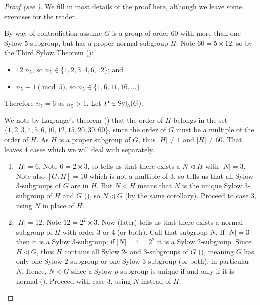 \begin{proof}[Proof (see {\cite[p.~145, Proposition 21]{dummit_foote_2004}})]
    We fill in most details of the proof here, although we leave some exercises for the reader.

    By way of contradiction assume $G$ is a group of order 60 with more than one Sylow 5-subgroup, but has a proper normal subgroup $H$. Note $60 = 5 \times 12$, so by the Third Sylow Theorem ():
    \begin{itemize}
        \item $12 \vert n_5$, so $n_5 \in \{1, 2, 3, 4, 6, 12\}$; and
        \item $n_5 \equiv 1 \pmod 5$, so $n_5 \in \{1, 6, 11, 16, \dots\}$.
    \end{itemize}
    Therefore $n_5 = 6$ as $n_5 > 1$. Let $P \in \mathrm{Syl}_{5}(G)$.

    We note by Lagrange's theorem () that the order of $H$ belongs in the set $\{1, 2, 3, 4, 5, 6, 10, 12, 15, 20, 30, 60\}$, since the order of $G$ must be a multiple of the order of $H$. As $H$ is a proper subgroup of $G$, thus $|H| \neq 1$ and $|H| \neq 60$. That leaves 4 cases which we will deal with separately.
    \begin{enumerate}
        \item $|H| = 6$. Note $6 = 2 \times 3$, so  tells us that there exists a $N \lhd H$ with $|N| = 3$. Note also $[G:H] = 10$ which is not a multiple of 3, so  tells us that all Sylow 3-subgroups of $G$ are in $H$. But $N \lhd H$ means that $N$ is the unique Sylow 3-subgroup of $H$ and $G$ (), so $N \lhd G$ (by the same corollary). Proceed to case 3, using $N$ in place of $H$.
        
        \item $|H| = 12$. Note $12 = 2^2 \times 3$. Now  (later) tells us that there exists a normal subgroup of $H$ with order 3 or 4 (or both). Call that subgroup $N$. If $|N| = 3$ then it is a Sylow 3-subgroup; if $|N| = 4 = 2^2$ it is a Sylow 2-subgroup. Since $H \lhd G$, thus $H$ contains all Sylow 2- and 3-subgroups of $G$ (), meaning $G$ has only one Sylow 2-subgroup or one Sylow 3-subgroup (or both), in particular $N$. Hence, $N \lhd G$ since a Sylow $p$-subgroup is unique if and only if it is normal (). Proceed with case 3, using $N$ instead of $H$.
        

\end{enumerate}
\end{proof}
